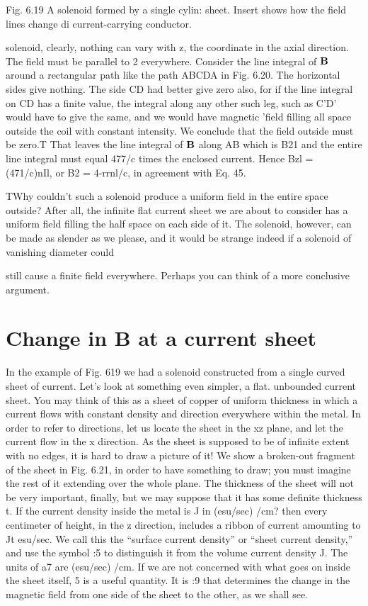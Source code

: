  

Fig. 6.19 A solenoid formed by a single cylin:
sheet. Insert shows how the field lines change di
current-carrying conductor.

solenoid, clearly, nothing can vary with z, the coordinate in the axial
direction. The field must be parallel to 2 everywhere. Consider the
line integral of $\mathbf{B}$ around a rectangular path like the path ABCDA in
Fig. 6.20. The horizontal sides give nothing. The side CD had better
give zero also, for if the line integral on CD has a finite value, the
integral along any other such leg, such as C'D' would have to give
the same, and we would have magnetic 'field filling all space outside
the coil with constant intensity. We conclude that the field outside
must be zero.T That leaves the line integral of $\mathbf{B}$ along AB which is
B21 and the entire line integral must equal 477/c times the enclosed
current. Hence Bzl = (471/c)nIl, or B2 = 4-rrnl/c, in agreement
with Eq. 45.

TWhy couldn't such a solenoid produce a uniform field in the entire space outside?
After all, the infinite flat current sheet we are about to consider has a uniform field
filling the half space on each side of it. The solenoid, however, can be made as slender
as we please, and it would be strange indeed if a solenoid of vanishing diameter could

still cause a finite field everywhere. Perhaps you can think of a more conclusive
argument.

\section{Change in B at a current sheet}

In the example of Fig. 619 we had a solenoid constructed from a
single curved sheet of current. Let's look at something even simpler,
a flat. unbounded current sheet. You may think of this as a sheet
of copper of uniform thickness in which a current flows with constant
density and direction everywhere within the metal. In order to refer
to directions, let us locate the sheet in the xz plane, and let the current
flow in the x direction. As the sheet is supposed to be of infinite extent
with no edges, it is hard to draw a picture of it! We show a
broken-out fragment of the sheet in Fig. 6.21, in order to have something
to draw; you must imagine the rest of it extending over the
whole plane. The thickness of the sheet will not be very important,
finally, but we may suppose that it has some definite thickness t. If
the current density inside the metal is J in (esu/sec) /cm? then every
centimeter of height, in the z direction, includes a ribbon of current
amounting to Jt esu/sec. We call this the ``surface current density''
or ``sheet current density,'' and use the symbol :5 to distinguish it from
the volume current density J. The units of a7 are (esu/sec) /cm. If
we are not concerned with what goes on inside the sheet itself, 5 is
a useful quantity. It is :9 that determines the change in the magnetic
field from one side of the sheet to the other, as we shall see.

